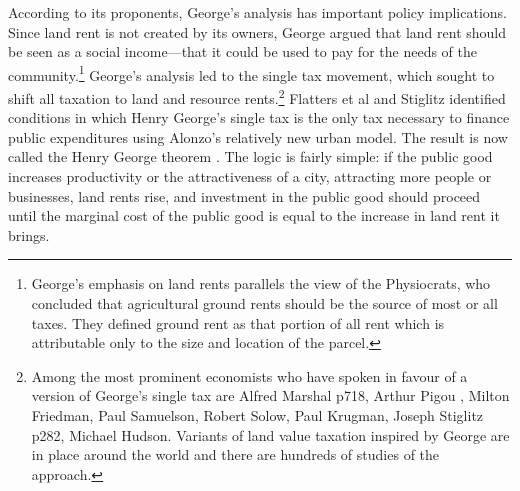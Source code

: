 
According to its proponents, George's analysis  has important policy implications. Since land rent is not created by its owners, George argued that land rent should be seen as a social income---that it could be used to pay for the needs of the community.\footnote{George's emphasis on land rents parallels the view of the Physiocrats, who concluded that agricultural \gls{ground rents} should be the source of most or all taxes. They defined ground rent as that portion of all rent which is attributable only to the size and location of the parcel.} %
George's analysis led to the {single tax} movement, which sought to shift all taxation to land  and resource rents.\footnote{Among the most prominent economists who have spoken in favour of a version of George's single tax are Alfred Marshal\cite{marshallPrinciplesEconomics1890} p718, Arthur Pigou \cite{pigouPolicyLandTaxation1909}, Milton Friedman, Paul Samuelson, Robert Solow, Paul Krugman, Joseph Stiglitz \cite{stiglitzTheoryLocalPublic1977} p282, Michael Hudson. Variants of land value taxation inspired by George are in place around the world and there are hundreds of studies of the approach.} 
Flatters et al \cite{flattersPublicGoodsEfficiency1974} and  Stiglitz \cite{stiglitzTheoryLocalPublic1977} identified  conditions in which Henry George's \gls{single tax} is the only tax necessary to finance public expenditures using Alonzo's relatively new urban model. The result is now called the \gls{Henry George theorem} \cite{arnottAggregateLandRents1979}.
The logic is fairly simple: if the public good increases productivity or the attractiveness of a city, attracting more people or businesses, land rents rise, and investment in the public good should proceed until the marginal cost of the public good is equal to the increase in land rent it brings. %


